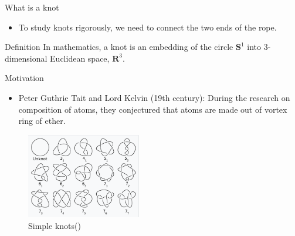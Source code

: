 \begin{frame}{What is a knot}
	\begin{itemize}
		\item To study knots rigorously, we need to connect the two ends of the rope.
	\end{itemize}
	\begin{kulblock}{Definition}
		In mathematics, a knot is an embedding of the circle $\mathbf{S}^1$ into 3-dimensional Euclidean space, $\mathbf{R}^3$.
	\end{kulblock}
	
\end{frame}

\begin{frame}{Motivation}
	\begin{itemize}
		\item Peter Guthrie Tait and Lord Kelvin (19th century): During the research on composition of atoms, they conjectured that atoms are made out of vortex ring of ether.
	\end{itemize}
	\begin{figure}
		\centering
		\includegraphics[width=5cm]{Pictures/simple knots.png}
		\caption{Simple knots(\cite{simpleknots})}
		\label{fig:enter-label}
	\end{figure}
	
\end{frame}

